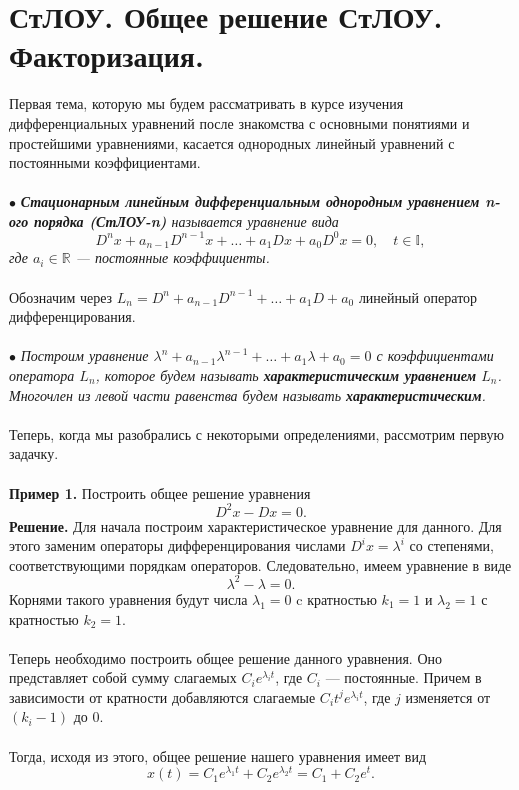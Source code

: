 \documentclass[a4paper, 12pt]{article}
\newcommand{\Rm}{\mathbb{R}}
\newcommand{\I}{\mathbb{I}}
\begin{document}
	\section*{СтЛОУ. Общее решение СтЛОУ. Факторизация.}
	Первая тема, которую мы будем рассматривать в курсе изучения дифференциальных уравнений после знакомства с основными понятиями и простейшими уравнениями, касается однородных линейный уравнений с постоянными коэффициентами.\\\\
	$\bullet$ \textit{\textbf{Стационарным линейным дифференциальным однородным уравнением n-ого порядка (СтЛОУ-n)} называется уравнение вида $$D^nx + a_{n-1}D^{n-1}x + \ldots + a_1Dx + a_0D^0x = 0,\quad t\in \I,$$ где $a_i \in \Rm$ --- постоянные коэффициенты.}\\\\
	Обозначим через $L_n = D^n + a_{n-1}D^{n-1} + \ldots + a_1D + a_0$ линейный оператор дифференцирования. \\\\
	$\bullet$ \textit{Построим уравнение $\lambda^n + a_{n-1}\lambda^{n-1} + \ldots + a_1\lambda + a_0 = 0$ с коэффициентами оператора $L_n$, которое будем называть \textbf{характеристическим уравнением} $L_n$. Многочлен из левой части равенства будем называть \textbf{характеристическим}.}\\\\
	Теперь, когда мы разобрались с некоторыми определениями, рассмотрим первую задачку.\\\\
	\textbf{Пример 1.} Построить общее решение уравнения $$D^2x - Dx = 0.$$
	\textbf{Решение.} Для начала построим характеристическое уравнение для данного. Для этого заменим операторы дифференцирования числами $D^ix = \lambda^i$ со степенями, соответствующими порядкам операторов. Следовательно, имеем уравнение в виде $$\lambda^2 - \lambda = 0.$$ Корнями такого уравнения будут числа $\lambda_1 = 0$ c кратностью $k_1 = 1$ и $\lambda_2 = 1$ с кратностью $k_2 = 1$.\\\\ Теперь необходимо построить общее решение данного уравнения. Оно представляет собой сумму слагаемых $C_ie^{\lambda_i t}$, где $C_i$ --- постоянные. Причем в зависимости от кратности добавляются слагаемые $C_{i} t^j e^{\lambda_i t}$, где $j$ изменяется от $(k_i - 1)$ до $0$.\\\\
	Тогда, исходя из этого, общее решение нашего уравнения имеет вид $$x(t) = C_1e^{\lambda_1 t} + C_2e^{\lambda_2 t} = C_1 + C_2e^t.$$
\end{document}

